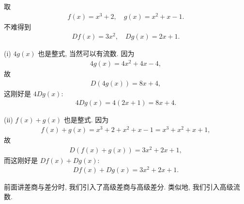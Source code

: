 \begin{example}
    取
    \begin{align*}
        f(x) = x^3 + 2, \quad g(x) = x^2 + x - 1.
    \end{align*}
    不难得到
    \begin{align*}
        Df (x) = 3x^2, \quad Dg (x) = 2x + 1.
    \end{align*}

    (i) $4g(x)$ 也是整式, 当然可以有流数. 因为
    \begin{align*}
        4g(x) = 4x^2 + 4x - 4,
    \end{align*}
    故
    \begin{align*}
        D(4g(x)) = 8x + 4,
    \end{align*}
    这刚好是 $4Dg(x)$:
    \begin{align*}
        4Dg(x) = 4(2x + 1) = 8x + 4.
    \end{align*}

    (ii) $f(x) + g(x)$ 也是整式. 因为
    \begin{align*}
        f(x) + g(x) = x^3 + 2 + x^2 + x - 1 = x^3 + x^2 + x + 1,
    \end{align*}
    故
    \begin{align*}
        D(f(x) + g(x)) = 3x^2 + 2x + 1,
    \end{align*}
    而这刚好是 $Df(x) + Dg(x)$:
    \begin{align*}
        Df(x) + Dg(x) = 3x^2 + 2x + 1.
    \end{align*}
\end{example}

前面讲差商与差分时, 我们引入了高级差商与高级差分. 类似地, 我们引入高级流数.

